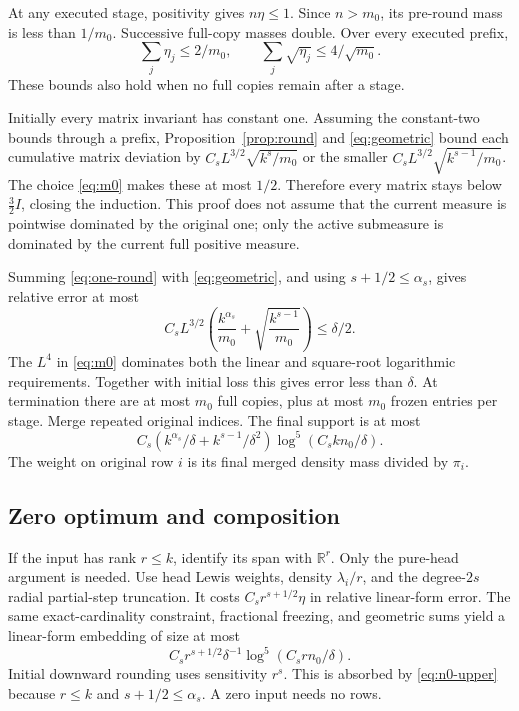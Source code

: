 \documentclass[11pt]{article}
\theoremstyle{remark}\newtheorem{remark}[theorem]{Remark}
\newcommand{\R}{\mathbb R}\newcommand{\E}{\mathbb E}\newcommand{\Prob}{\mathbb P}
\begin{document}
At any executed stage, positivity gives $n\eta\le1$. Since $n>m_0$, its pre-round mass is less than $1/m_0$. Successive full-copy masses double. Over every executed prefix,
\begin{equation}\label{eq:geometric}
 \sum_j\eta_j\le2/m_0,\qquad \sum_j\sqrt{\eta_j}\le4/\sqrt{m_0}.
\end{equation}
These bounds also hold when no full copies remain after a stage.

Initially every matrix invariant has constant one. Assuming the constant-two bounds through a prefix, Proposition~\ref{prop:round} and \eqref{eq:geometric} bound each cumulative matrix deviation by $C_sL^{3/2}\sqrt{k^s/m_0}$ or the smaller $C_sL^{3/2}\sqrt{k^{s-1}/m_0}$. The choice \eqref{eq:m0} makes these at most $1/2$. Therefore every matrix stays below $\frac32I$, closing the induction. This proof does not assume that the current measure is pointwise dominated by the original one; only the active submeasure is dominated by the current full positive measure.

Summing \eqref{eq:one-round} with \eqref{eq:geometric}, and using $s+1/2\le\alpha_s$, gives relative error at most
\begin{equation}\label{eq:total-error}
 C_s L^{3/2}\left(\frac{k^{\alpha_s}}{m_0}+
 \sqrt{\frac{k^{s-1}}{m_0}}\right)\le\delta/2.
\end{equation}
The $L^4$ in \eqref{eq:m0} dominates both the linear and square-root logarithmic requirements. Together with initial loss this gives error less than $\delta$. At termination there are at most $m_0$ full copies, plus at most $m_0$ frozen entries per stage. Merge repeated original indices. The final support is at most
\begin{equation}\label{eq:n0-upper}
 C_s\left(k^{\alpha_s}/\delta+k^{s-1}/\delta^2\right)
 \log^5(C_s k n_0/\delta).
\end{equation}
The weight on original row $i$ is its final merged density mass divided by $\pi_i$.

\subsection{Zero optimum and composition}
If the input has rank $r\le k$, identify its span with $\R^r$. Only the pure-head argument is needed. Use head Lewis weights, density $\lambda_i/r$, and the degree-$2s$ radial partial-step truncation. It costs $C_s r^{s+1/2}\eta$ in relative linear-form error. The same exact-cardinality constraint, fractional freezing, and geometric sums yield a linear-form embedding of size at most
\[
 C_s r^{s+1/2}\delta^{-1}\log^5(C_srn_0/\delta).
\]
Initial downward rounding uses sensitivity $r^s$. This is absorbed by \eqref{eq:n0-upper} because $r\le k$ and $s+1/2\le\alpha_s$. A zero input needs no rows.
\end{document}

